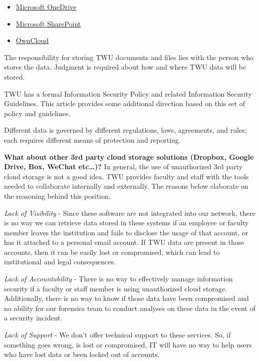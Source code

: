\documentclass[
]{book}
\providecommand{\tightlist}{%
  \setlength{\itemsep}{0pt}\setlength{\parskip}{0pt}}
\theoremstyle{definition}
\theoremstyle{definition}
\theoremstyle{definition}
\theoremstyle{definition}
\theoremstyle{remark}
\begin{document}
\begin{itemize}
\tightlist
\item
  \href{https://trinitywestern.teamdynamix.com/TDClient/1904/Portal/KB/ArticleDet?ID=71260}{Microsoft OneDrive}\\
\item
  \href{https://mytwu.sharepoint.com/}{Microsoft SharePoint}\\
\item
  \href{https://trinitywestern.teamdynamix.com/TDClient/1904/Portal/KB/ArticleDet?ID=15681}{OwnCloud}
\end{itemize}

The responsibility for storing TWU documents and files lies with the person who stores the data. Judgment is required about how and where TWU data will be stored.

TWU has a formal Information Security Policy and related Information Security Guidelines. This article provides some additional direction based on this set of policy and guidelines.

Different data is governed by different regulations, laws, agreements, and rules; each requires different means of protection and reporting.

\textbf{What about other 3rd party cloud storage solutions (Dropbox, Google Drive, Box, WeChat etc\ldots)?}
In general, the use of unauthorized 3rd party cloud storage is not a good idea. TWU provides faculty and staff with the tools needed to collaborate internally and externally. The reasons below elaborate on the reasoning behind this position.

\emph{Lack of Visibility} - Since these software are not integrated into our network, there is no way we can retrieve data stored in these systems if an employee or faculty member leaves the institution and fails to disclose the usage of that account, or has it attached to a personal email account. If TWU data are present in those accounts, then it can be easily lost or compromised, which can lead to institutional and legal consequences.

\emph{Lack of Accountability} - There is no way to effectively manage information security if a faculty or staff member is using unauthorized cloud storage. Additionally, there is no way to know if those data have been compromised and no ability for our forensics team to conduct analyses on these data in the event of a security incident.

\emph{Lack of Support} - We don't offer technical support to these services. So, if something goes wrong, is lost or compromised, IT will have no way to help users who have lost data or been locked out of accounts.
\end{document}

